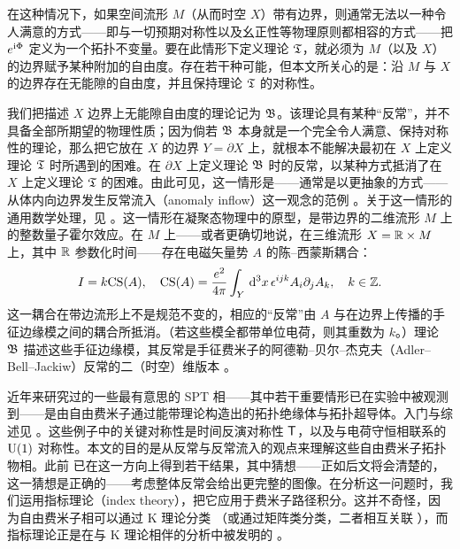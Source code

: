 在这种情况下，如果空间流形 $M$（从而时空 $X$）带有边界，则通常无法以一种令人满意的方式------即与一切预期对称性以及幺正性等物理原则都相容的方式------把 $e^{{\mathrm i}\Phi}$ 定义为一个拓扑不变量。要在此情形下定义理论 ${\mathfrak T}$，就必须为 $M$（以及 $X$）的边界赋予某种附加的自由度。存在若干种可能，但本文所关心的是：沿 $M$ 与 $X$ 的边界存在无能隙的自由度，并且保持理论 ${\mathfrak T}$ 的对称性。

我们把描述 $X$ 边界上无能隙自由度的理论记为 ${\mathfrak B}$。该理论具有某种“反常”，并不具备全部所期望的物理性质；因为倘若 ${\mathfrak B}$ 本身就是一个完全令人满意、保持对称性的理论，那么把它放在 $X$ 的边界 $Y=\partial X$ 上，就根本不能解决最初在 $X$ 上定义理论 ${\mathfrak T}$ 时所遇到的困难。在 $\partial X$ 上定义理论 ${\mathfrak B}$ 时的反常，以某种方式抵消了在 $X$ 上定义理论 ${\mathfrak T}$ 的困难。由此可见，这一情形是------通常是以更抽象的方式------从体内向边界发生反常流入（anomaly inflow）这一观念的范例 \cite{CH}。关于这一情形的通用数学处理，见 \cite{FreedTwo}。这一情形在凝聚态物理中的原型，是带边界的二维流形 $M$ 上的整数量子霍尔效应。在 $M$ 上------或者更确切地说，在三维流形 $X={\mathbb{R}}\times M$ 上，其中 ${\mathbb{R}}$ 参数化时间------存在电磁矢量势 $A$ 的陈--西蒙斯耦合：
\begin{equation}\label{csm}I=k{\mathrm{CS}}(A), ~~~{\mathrm{CS}}(A)=\frac{e^2}{4\pi}\int_Y\,{\mathrm d}^3x \,\epsilon^{ijk}A_i\partial_jA_k,~~~k\in{\mathbb{Z}}. \end{equation}
这一耦合在带边流形上不是规范不变的，相应的“反常”由 $A$ 与在边界上传播的手征边缘模之间的耦合所抵消。（若这些模全都带单位电荷，则其重数为 $k$。）理论 ${\mathfrak B}$ 描述这些手征边缘模，其反常是手征费米子的阿德勒--贝尔--杰克夫（Adler--Bell--Jackiw）反常的二（时空）维版本 \cite{Adler,BJ}。

近年来研究过的一些最有意思的 SPT 相------其中若干重要情形已在实验中被观测到------是由自由费米子通过能带理论构造出的拓扑绝缘体与拓扑超导体。入门与综述见 \cite{KH,ZQ,MZ}。这些例子中的关键对称性是时间反演对称性 ${\sf T}$，以及与电荷守恒相联系的 ${\mathrm U}(1)$ 对称性。本文的目的是从反常与反常流入的观点来理解这些自由费米子拓扑物相。此前 \cite{RML} 已在这一方向上得到若干结果，其中猜想------正如后文将会清楚的，这一猜想是正确的------考虑整体反常会给出更完整的图像。在分析这一问题时，我们运用指标理论（index theory），把它应用于费米子路径积分。这并不奇怪，因为自由费米子相可以通过 K 理论分类 \cite{Kitaev}（或通过矩阵类分类，二者相互关联 \cite{RSFL}），而指标理论正是在与 K 理论相伴的分析中被发明的 \cite{ASfirst,AS}。

